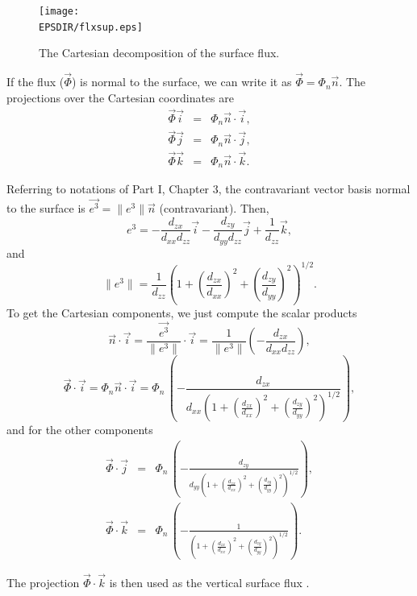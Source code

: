 \begin{figure}[!ht]
\centerline{\texttt{[image: \\EPSDIR/flxsup.eps]}}
\caption{The Cartesian decomposition of the surface flux.}
\label{flxsup}
\end{figure}


If the flux ($\vec{\Phi}$) is normal to the surface, we can write it as
$\vec{\Phi}=\Phi_n \vec{n}$. The projections over the Cartesian coordinates
are
\begin{eqnarray}
\vec{\Phi} \vec{i}&=&\Phi_n \vec{n} \cdot \vec{i}, \nonumber \\
\vec{\Phi} \vec{j}&=&\Phi_n \vec{n} \cdot \vec{j}, \nonumber \\
\vec{\Phi} \vec{k}&=&\Phi_n \vec{n} \cdot \vec{k}.
\end{eqnarray}

Referring to notations of Part I, Chapter 3, the contravariant vector basis normal
to the surface is $\vec{e^3}=\|e^3\| \vec{n}$ (contravariant). Then,
\begin{equation}
e^3=-\frac{d_{zx}}{d_{xx}d_{zz}} \vec{i}
-\frac{d_{zy}}{d_{yy}d_{zz}} \vec{j} + \frac{1}{d_{zz}} \vec{k},
\end{equation}
and
\begin{equation}
\|e^3\|=
\frac{1}{d_{zz}}{(1+(\frac{d_{zx}}{d_{xx}})^2+(\frac{d_{zy}}{d_{yy}})^2)}^{1/2}.
\end{equation}
To get the Cartesian components, we just compute the scalar products
\begin{equation}
\vec{n} \cdot \vec{i} = \frac {\vec{e^3}}{\|e^3\|} \cdot \vec{i} =
\frac{1}{\|e^3\|}(-\frac{d_{zx}}{d_{xx}d_{zz}}),
\end{equation}
\begin{equation}
\vec{\Phi}\cdot\vec{i}=\Phi_n \vec{n}\cdot\vec{i}=
\Phi_n\, (-\frac{d_{zx}}
{d_{xx}(1+(\frac{d_{zx}}{d_{xx}})^2+(\frac{d_{zy}}{d_{yy}})^2)^{1/2}}),
\end{equation}
and for the other components
\begin{eqnarray}
\vec{\Phi}\cdot\vec{j}&=&\Phi_n\, (-\frac{d_{zy}}
{d_{yy}(1+(\frac{d_{zx}}{d_{xx}})^2+(\frac{d_{zy}}{d_{yy}})^2)^{1/2}}), \\
\vec{\Phi}\cdot\vec{k}&=&\Phi_n\, (-\frac{1}
{(1+(\frac{d_{zx}}{d_{xx}})^2+(\frac{d_{zy}}{d_{yy}})^2)^{1/2}}).
\end{eqnarray}

The projection $\vec{\Phi} \cdot \vec{k}$ is then used as the vertical
surface flux .

